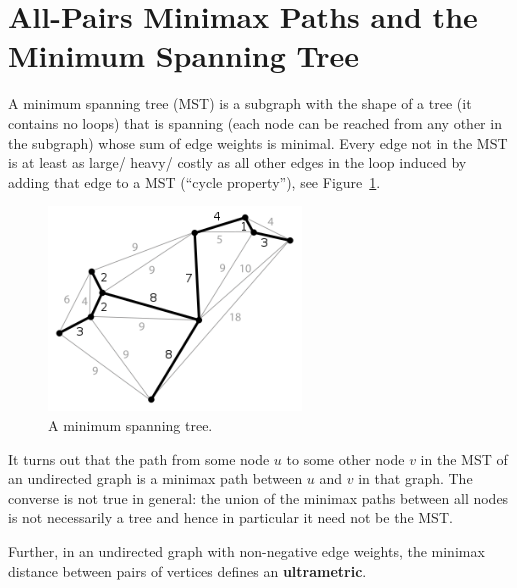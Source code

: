 \section{All-Pairs Minimax Paths and the Minimum Spanning Tree}
A minimum spanning tree (MST) is a subgraph with the shape of a tree (\ie it
contains no loops) that is spanning (\ie each node can be reached from any other
in the subgraph) whose sum of edge weights is minimal. Every edge not in the MST
is at least as large/ heavy/ costly as all other edges in the loop induced by
adding that edge to a MST (``cycle property''), see Figure~\ref{fig:mst}.
\begin{figure}[htpb]
  \centering \includegraphics[width=0.6\textwidth]{Figures/MST}
  \caption{A minimum spanning tree.}%
  \label{fig:mst}
\end{figure}

It turns out that the path from some node $u$ to some other node $v$ in the MST
of an undirected graph is a minimax path between $u$ and $v$ in that graph. The
converse is not true in general: the union of the minimax paths between all
nodes is not necessarily a tree and hence in particular it need not be the MST.

Further, in an undirected graph with non-negative edge weights, the minimax
distance between pairs of vertices defines an \textbf{ultrametric}.

